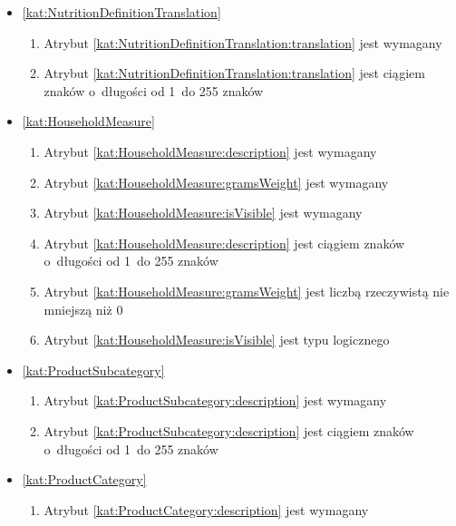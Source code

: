 \begin{itemize}[label={\textbf{Ograniczenia dla}}, wide, labelwidth=!, labelindent=0pt]
    \item\ref{kat:NutritionDefinitionTranslation}\mynobreakpar
    \begin{enumerate}[label={\textbf{OGR/1/\protect\twodigits{\arabic{enumi}}}}, wide, labelwidth=!, align=left, leftmargin=3cm, resume]
        \item Atrybut \ref{kat:NutritionDefinitionTranslation:translation} jest wymagany

        \item Atrybut \ref{kat:NutritionDefinitionTranslation:translation} jest ciągiem znaków o~długości od 1~do 255 znaków
    \end{enumerate}

    \item\ref{kat:HouseholdMeasure}\mynobreakpar
    \begin{enumerate}[label={\textbf{OGR/1/\protect\twodigits{\arabic{enumi}}}}, wide, labelwidth=!, align=left, leftmargin=3cm, resume]
        \item Atrybut \ref{kat:HouseholdMeasure:description} jest wymagany
        \item Atrybut \ref{kat:HouseholdMeasure:gramsWeight} jest wymagany
        \item Atrybut \ref{kat:HouseholdMeasure:isVisible} jest wymagany

        \item Atrybut \ref{kat:HouseholdMeasure:description} jest ciągiem znaków o~długości od 1~do 255 znaków
        \item Atrybut \ref{kat:HouseholdMeasure:gramsWeight} jest liczbą rzeczywistą nie mniejszą niż 0
        \item Atrybut \ref{kat:HouseholdMeasure:isVisible} jest typu logicznego
    \end{enumerate}

    \item\ref{kat:ProductSubcategory}\mynobreakpar
    \begin{enumerate}[label={\textbf{OGR/1/\protect\twodigits{\arabic{enumi}}}}, wide, labelwidth=!, align=left, leftmargin=3cm, resume]
        \item Atrybut \ref{kat:ProductSubcategory:description} jest wymagany

        \item Atrybut \ref{kat:ProductSubcategory:description} jest ciągiem znaków o~długości od 1~do 255 znaków
    \end{enumerate}

    \item\ref{kat:ProductCategory}\mynobreakpar
    \begin{enumerate}[label={\textbf{OGR/1/\protect\twodigits{\arabic{enumi}}}}, wide, labelwidth=!, align=left, leftmargin=3cm, resume]
        \item Atrybut \ref{kat:ProductCategory:description} jest wymagany


\end{enumerate}
\end{itemize}
